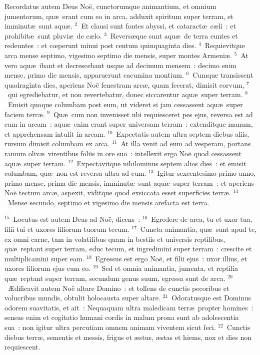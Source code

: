 \lettrine[lines=3,image=true,loversize=0.05,lraise=-0.03]{R}{}ecordatus autem Deus No\"e, cunctorumque animantium, et omnium jumentorum, qu\ae\ erant cum eo in arca, adduxit spiritum super terram, et imminut\ae\ sunt aqu\ae .
${}^{2}$~Et clausi sunt fontes abyssi, et cataract\ae\ c\ae li~: et prohibit\ae\ sunt pluvi\ae\ de c\ae lo.
${}^{3}$~Revers\ae que sunt aqu\ae\ de terra euntes et redeuntes~: et cœperunt minui post centum quinquaginta dies.
${}^{4}$~Requievitque arca mense septimo, vigesimo septimo die mensis, super montes Armeni\ae .
${}^{5}$~At vero aqu\ae\ ibant et decrescebant usque ad decimum mensem~: decimo enim mense, primo die mensis, apparuerunt cacumina montium.
${}^{6}$~Cumque transissent quadraginta dies, aperiens No\"e fenestram arc\ae , quam fecerat, dimisit corvum,
${}^{7}$~qui egrediebatur, et non revertebatur, donec siccarentur aqu\ae\ super terram.
${}^{8}$~Emisit quoque columbam post eum, ut videret si jam cessassent aqu\ae\ super faciem terr\ae .
${}^{9}$~Qu\ae\ cum non invenisset ubi requiesceret pes ejus, reversa est ad eum in arcam~: aqu\ae\ enim erant super universam terram~: extenditque manum, et apprehensam intulit in arcam.
${}^{10}$~Expectatis autem ultra septem diebus aliis, rursum dimisit columbam ex arca.
${}^{11}$~At illa venit ad eum ad vesperam, portans ramum oliv\ae\ virentibus foliis in ore suo~: intellexit ergo No\"e quod cessassent aqu\ae\ super terram.
${}^{12}$~Expectavitque nihilominus septem alios dies~: et emisit columbam, qu\ae\ non est reversa ultra ad eum.
${}^{13}$~Igitur sexcentesimo primo anno, primo mense, prima die mensis, imminut\ae\ sunt aqu\ae\ super terram~: et aperiens No\"e tectum arc\ae , aspexit, viditque quod exsiccata esset superficies terr\ae .
${}^{14}$~Mense secundo, septimo et vigesimo die mensis arefacta est terra.


${}^{15}$~Locutus est autem Deus ad No\"e, dicens~:
${}^{16}$~Egredere de arca, tu et uxor tua, filii tui et uxores filiorum tuorum tecum.
${}^{17}$~Cuncta animantia, qu\ae\ sunt apud te, ex omni carne, tam in volatilibus quam in bestiis et universis reptilibus, qu\ae\ reptant super terram, educ tecum, et ingredimini super terram~: crescite et multiplicamini super eam.
${}^{18}$~Egressus est ergo No\"e, et filii ejus~: uxor illius, et uxores filiorum ejus cum eo.
${}^{19}$~Sed et omnia animantia, jumenta, et reptilia qu\ae\ reptant super terram, secundum genus suum, egressa sunt de arca.
${}^{20}$~\AE dificavit autem No\"e altare Domino~: et tollens de cunctis pecoribus et volucribus mundis, obtulit holocausta super altare.
${}^{21}$~Odoratusque est Dominus odorem suavitatis, et ait~: Nequaquam ultra maledicam terr\ae\ propter homines~: sensus enim et cogitatio humani cordis in malum prona sunt ab adolescentia sua~: non igitur ultra percutiam omnem animam viventem sicut feci.
${}^{22}$~Cunctis diebus terr\ae , sementis et messis, frigus et \ae stus, \ae stas et hiems, nox et dies non requiescent.

